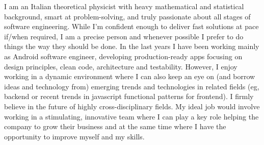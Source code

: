 
\begin{cvparagraph}
I am an Italian theoretical physicist with heavy mathematical and statistical 
background, smart at problem-solving, and truly passionate about all stages of software engineering. 
While 
I'm confident enough to
deliver 
fast solutions at pace
if/when
required, 
I am a precise person and whenever possible I prefer to do things the way they
should be done.
In the last years I have been working mainly as Android software engineer,  developing production-ready apps 
	focusing on design principles, clean code, architecture and testability.
 However, I enjoy  working in a dynamic
environment 
 where I can also keep an eye on (and borrow ideas and technology from) emerging trends and technologies in related
fields (eg, backend or recent trends in javascript functional patterns for frontend). 
 I firmly
believe in the future of highly cross-disciplinary fields.
My ideal job would involve working in a stimulating, innovative team where I
can play a key role helping the company to grow their business and at the same time
where I have the opportunity to improve myself and my skills.
\end{cvparagraph}
